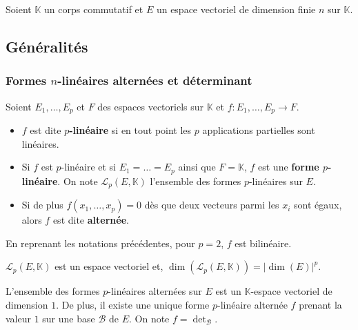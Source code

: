 




	Soient $\mathbb{K}$ un corps commutatif et $E$ un espace vectoriel de dimension finie $n$ sur $\mathbb{K}$.

	\subsection{Généralités}

	\subsubsection{Formes \texorpdfstring{$n$}{n}-linéaires alternées et déterminant}


	\begin{definition}
		Soient $E_1, \dots, E_p$ et $F$ des espaces vectoriels sur $\mathbb{K}$ et $f : E_1, \dots, E_p \rightarrow F$.
		\begin{itemize}
			\item $f$ est dite \textbf{$p$-linéaire} si en tout point les $p$ applications partielles sont linéaires.
			\item Si $f$ est $p$-linéaire et si $E_1 = \dots = E_p$ ainsi que $F = \mathbb{K}$, $f$ est une \textbf{forme $p$-linéaire}. On note $\mathcal{L}_p(E, \mathbb{K})$ l'ensemble des formes $p$-linéaires sur $E$.
			\item Si de plus $f(x_1, \dots, x_p) = 0$ dès que deux vecteurs parmi les $x_i$ sont égaux, alors $f$ est dite \textbf{alternée}.
		\end{itemize}
	\end{definition}

	\begin{example}
		En reprenant les notations précédentes, pour $p = 2$, $f$ est bilinéaire.
	\end{example}

	\begin{proposition}
		$\mathcal{L}_p(E, \mathbb{K})$ est un espace vectoriel et, $\operatorname{dim}(\mathcal{L}_p(E, \mathbb{K})) = |\operatorname{dim}(E)|^p$.
	\end{proposition}

	\begin{theorem}
		L'ensemble des formes $p$-linéaires alternées sur $E$ est un $\mathbb{K}$-espace vectoriel de dimension $1$. De plus, il existe une unique forme $p$-linéaire alternée $f$ prenant la valeur $1$ sur une base $\mathcal{B}$ de $E$. On note $f = \det_{\mathcal{B}}$.
	\end{theorem}

